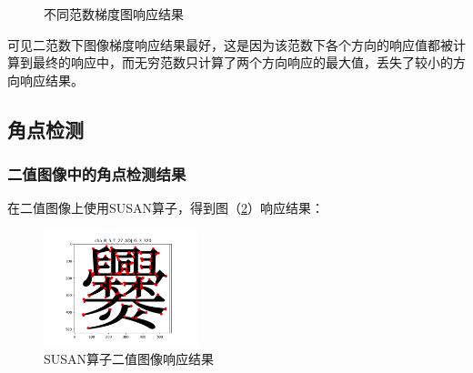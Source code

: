 \documentclass[a4paper,11pt,UTF8]{ctexart}
\begin{document}
\begin{figure}[htbp]

    \caption{不同范数梯度图响应结果}    %
    \label{sobelb}    %
\end{figure}

可见二范数下图像梯度响应结果最好，这是因为该范数下各个方向的响应值都被计算到最终的响应中，而无穷范数只计算了两个方向响应的最大值，丢失了较小的方向响应结果。

\subsection{角点检测}
\subsubsection{二值图像中的角点检测结果}
在二值图像上使用SUSAN算子，得到图（\ref{susan_cuan}）响应结果：
\begin {figure}[h]
\centering %
\includegraphics[width=0.4\textwidth]{susan_cuan.png}
\caption{SUSAN算子二值图像响应结果} %
\label{susan_cuan}
\end {figure}
\end{document}
